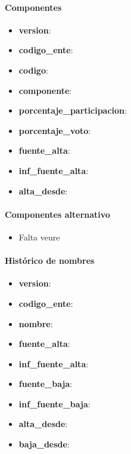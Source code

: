 \documentclass[12pt]{article}
\begin{document}
\paragraph{Componentes\\}
\begin{itemize}
    \item \textbf{version}:
    \item \textbf{codigo\_ente}:
    \item \textbf{codigo}:
    \item \textbf{componente}:
    \item \textbf{porcentaje\_participacion}:
    \item \textbf{porcentaje\_voto}:
    \item \textbf{fuente\_alta}:
    \item \textbf{inf\_fuente\_alta}:
    \item \textbf{alta\_desde}:
\end{itemize}

\paragraph{Componentes alternativo\\}
\begin{itemize}
    \item Falta veure
\end{itemize}

\paragraph{Histórico de nombres\\}
\begin{itemize}
    \item \textbf{version}:
    \item \textbf{codigo\_ente}:
    \item \textbf{nombre}:
    \item \textbf{fuente\_alta}:
    \item \textbf{inf\_fuente\_alta}:
    \item \textbf{fuente\_baja}:
    \item \textbf{inf\_fuente\_baja}:
    \item \textbf{alta\_desde}:
    \item \textbf{baja\_desde}:
\end{itemize}
\end{document}
